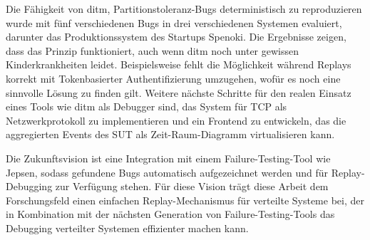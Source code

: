 \documentclass[12pt,a4paper]{report}
\begin{document}
Die Fähigkeit von ditm, Partitionstoleranz-Bugs deterministisch zu reproduzieren wurde mit fünf verschiedenen Bugs in drei verschiedenen Systemen
evaluiert, darunter das Produktionssystem des Startups Spenoki. Die Ergebnisse zeigen, dass das Prinzip funktioniert, auch wenn
ditm noch unter gewissen Kinderkrankheiten leidet. Beispielsweise fehlt die Möglichkeit während Replays korrekt mit Tokenbasierter
Authentifizierung umzugehen, wofür es noch eine sinnvolle Lösung zu finden gilt. Weitere nächste Schritte für den realen Einsatz
eines Tools wie ditm als Debugger sind, das System für TCP als Netzwerkprotokoll zu implementieren und ein Frontend zu entwickeln,
das die aggregierten Events des SUT als Zeit-Raum-Diagramm virtualisieren kann.

Die Zukunftsvision ist eine Integration mit einem Failure-Testing-Tool wie Jepsen, sodass gefundene Bugs automatisch
aufgezeichnet werden und für Replay-Debugging zur Verfügung stehen. Für diese Vision trägt diese Arbeit dem
Forschungsfeld einen einfachen Replay-Mechanismus für verteilte Systeme bei, der in Kombination mit der nächsten Generation von
Failure-Testing-Tools das Debugging verteilter Systemen effizienter machen kann.

% 
% 

\printbibliography
\end{document}
